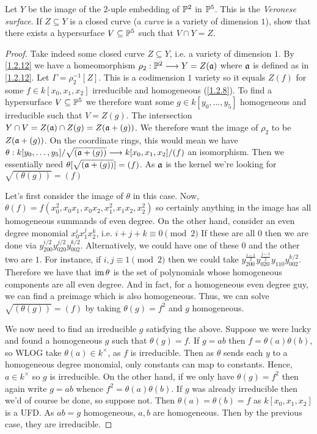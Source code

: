 \label{1.2.13}

Let $Y$ be the image of the 2-uple embedding of $\P^2$ in $\P^5$. This is the \textit{Veronese surface}. If $Z \subseteq Y$ is a closed curve (a \textit{curve} is a variety of dimension $1$), show that
there exists a hypersurface $V \subseteq \P^5$ such that $V \cap Y = Z$.

\begin{proof}
    Take indeed some closed curve $Z \subseteq Y$, i.e. a variety of dimension $1$. By \ref{1.2.12} we have a homeomorphism $\rho_2: \P^2 \longrightarrow Y = Z(\a)$ where $\a$ is defined as in \ref{1.2.12}. Let $\Gamma = \rho_2^{-1}[Z]$. This is a codimension $1$ variety so it equals $Z(f)$ for some $f \in k[x_0, x_1, x_2]$ irreducible and homogeneous (\ref{1.2.8}). To find a hypersurface $V \subseteq \P^5$ we therefore want some $g \in k[y_0, \dots, y_5]$ homogeneous and irreducible such that $V = Z(g)$. The intersection $Y \cap V = Z(\a) \cap Z(g) = Z(\a + (g))$. We therefore want the image of $\rho_2$ to be $Z(\a + (g))$. On the coordinate rings, this would mean we have $\theta: k[y_0, \dots, y_5] / \sqrt{(\a + (g))} \longrightarrow k[x_0, x_1, x_2]/(f)$ an isomorphism. Then we essentially need $\theta[\sqrt{(\a + (g))}] = (f)$. As $\a$ is the kernel we're looking for $\sqrt{(\theta(g))} = (f)$

    Let's first consider the image of $\theta$ in this case. Now, $\theta(f) = f(x_0^2, x_0 x_1, x_0 x_2, x_1^2, x_1 x_2, x_2^2)$ so certainly anything in the image has all homogeneous summands of even degree. On the other hand, consider an even degree monomial $x_0^i x_1^j x_2^k$, i.e. $i + j + k \equiv 0 \pmod{2}$ If these are all $0$ then we are done via $y_{200}^{i/2} y_{020}^{j/2} y_{002}^{k/2}$. Alternatively, we could have one of these $0$ and the other two are $1$. For instance, if $i, j \equiv 1 \pmod{2}$ then we could take $y_{200}^{\frac{i-1}{2}} y_{020}^{\frac{j - 1}{2}} y_{110} y_{002}^{k/2}$. Therefore we have that $\im \theta$ is the set of polynomials whose homogeneous components are all even degree. And in fact, for a homogeneous even degree guy, we can find a preimage which is also homogeneous. Thus, we can solve $\sqrt{(\theta(g))} = (f)$ by taking $\theta(g) = f^2$ and $g$ homogeneous.

    We now need to find an irreducible $g$ satisfying the above. Suppose we were lucky and found a homogeneous $g$ such that $\theta(g) = f$. If $g = ab$ then $f = \theta(a) \theta(b)$, so WLOG take $\theta(a) \in k^\times$, as $f$ is irreducible. Then as $\theta$ sends each $y$ to a homogeneous degree monomial, only constants can map to constants. Hence, $a \in k^\times$ so $g$ is irreducible. On the other hand, if we only have $\theta(g) = f^2$ then again write $g = ab$ whence $f^2 = \theta(a) \theta(b)$. If $g$ was already irreducible then we'd of course be done, so suppose not. Then $\theta(a) = \theta(b) = f$ as $k[x_0, x_1, x_2]$ is a UFD. As $ab = g$ homogeneous, $a, b$ are homogeneous. Then by the previous case, they are irreducible.


\end{proof}
